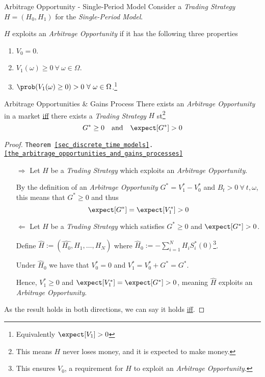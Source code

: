 \documentclass[11pt,a4paper]{article}
\begin{document}
  \begin{definition}{Arbitrage Opportunity - Single-Period Model}
    Consider a \textit{Trading Strategy} $H=(H_0,H_1)$ for the \textit{Single-Period Model}.
    \par $H$ exploits an \textit{Arbitrage Opportunity} if it has the following three properties
    \begin{enumerate}
      \item $V_0=0$.
      \item $V_1(\omega)\geq0\ \forall\ \omega\in\Omega$.
      \item $\prob(V_1(\omega)\geq0)>0\ \forall\ \omega\in\Omega$.\footnote{Equivalently $\expect[V_1]>0$}
    \end{enumerate}
  \end{definition}

  \begin{theorem}{Arbitrage Opportunities \& Gains Process}\label{the_arbitrage_opportunities_and_gains_processes}
    There exists an \textit{Arbitrage Opportunity} in a market \underline{iff} there exists a \textit{Trading Strategy} $H$ st\footnote{This means $H$ never loses money, and it is expected to make money.}
    \[ G^*\geq0\quad\text{and}\quad\expect[G^*]>0 \]
  \end{theorem}

  \begin{proof}{\texttt{Theorem \ref{sec_discrete_time_models}.\ref{the_arbitrage_opportunities_and_gains_processes}}}
    \begin{itemize}
      \item[$\Rightarrow$] Let $H$ be a \textit{Trading Strategy} which exploits an \textit{Arbitrage Opportunity}.
      \par By the definition of an \textit{Arbitrage Opportunity} $G^*=V_1^*-V_0^*$ and $B_t>0\ \forall\ t,\omega$, this means that $G^*\geq0$ and thus
      \[ \expect[G^*]=\expect[V_1^*]>0 \]
      \item[$\Leftarrow$] Let $H$ be a \textit{Trading Strategy} which satisfies $G^*\geq0$ and $\expect[G^*]>0$.
      \par Define $\hat{H}:=(\hat{H_0},H_1,\dots,H_N)$ where $\hat{H}_0:=-\sum_{i=1}^NH_iS_i^*(0)$\footnote{This ensures $V_0$, a requirement for $H$ to exploit an \textit{Arbitrage Opportunity}.}.
      \par Under $\hat{H}_0$ we have that $V_0^*=0$ and $V_1^*=V_0^*+G^*=G^*$.
      \par Hence, $V_1^*\geq0$ and $\expect[V_1^*]=\expect[G^*]>0$, meaning $\hat{H}$ exploits an \textit{Arbitrage Opportunity}.
    \end{itemize}
    As the result holds in both directions, we can say it holds \underline{iff}.
  \end{proof}
\end{document}
